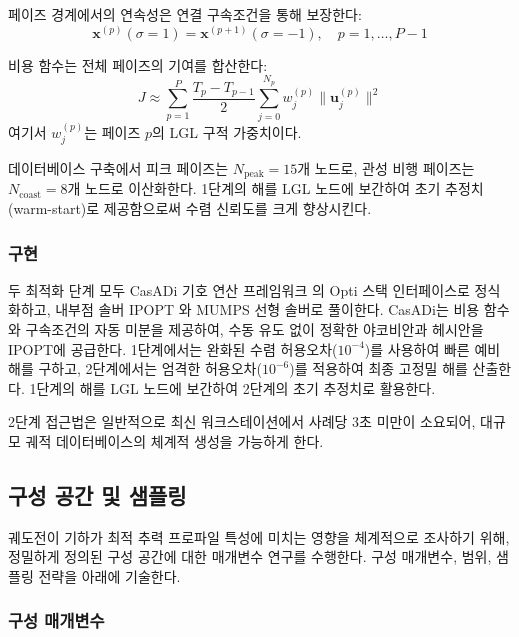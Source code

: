 페이즈 경계에서의 연속성은 연결 구속조건을 통해 보장한다:
\begin{equation}
\mathbf{x}^{(p)}(\sigma = 1) = \mathbf{x}^{(p+1)}(\sigma = -1), \quad p = 1, \ldots, P-1
\end{equation}

비용 함수는 전체 페이즈의 기여를 합산한다:
\begin{equation}
J \approx \sum_{p=1}^{P} \frac{T_p - T_{p-1}}{2} \sum_{j=0}^{N_p} w_j^{(p)} \|\mathbf{u}_j^{(p)}\|^2
\end{equation}
여기서 $w_j^{(p)}$는 페이즈 $p$의 LGL 구적 가중치이다.

데이터베이스 구축에서 피크 페이즈는 $N_{\text{peak}} = 15$개 노드로, 관성 비행 페이즈는 $N_{\text{coast}} = 8$개 노드로 이산화한다. 1단계의 해를 LGL 노드에 보간하여 초기 추정치(warm-start)로 제공함으로써 수렴 신뢰도를 크게 향상시킨다.

\subsubsection{구현}

두 최적화 단계 모두 CasADi 기호 연산 프레임워크 \citep{Andersson2019}의 Opti 스택 인터페이스로 정식화하고, 내부점 솔버 IPOPT \citep{Waechter2006}와 MUMPS 선형 솔버로 풀이한다. CasADi는 비용 함수와 구속조건의 자동 미분을 제공하여, 수동 유도 없이 정확한 야코비안과 헤시안을 IPOPT에 공급한다. 1단계에서는 완화된 수렴 허용오차($10^{-4}$)를 사용하여 빠른 예비 해를 구하고, 2단계에서는 엄격한 허용오차($10^{-6}$)를 적용하여 최종 고정밀 해를 산출한다. 1단계의 해를 LGL 노드에 보간하여 2단계의 초기 추정치로 활용한다.

2단계 접근법은 일반적으로 최신 워크스테이션에서 사례당 3초 미만이 소요되어, 대규모 궤적 데이터베이스의 체계적 생성을 가능하게 한다.

\subsection{구성 공간 및 샘플링}\label{subsec:configuration}

궤도전이 기하가 최적 추력 프로파일 특성에 미치는 영향을 체계적으로 조사하기 위해, 정밀하게 정의된 구성 공간에 대한 매개변수 연구를 수행한다. 구성 매개변수, 범위, 샘플링 전략을 아래에 기술한다.

\subsubsection{구성 매개변수}

